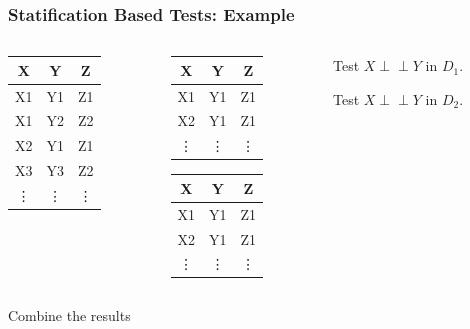 \documentclass{beamer}
\def\ci{\perp\!\!\!\!\!\perp}
\begin{document}
\begin{frame}
	\frametitle{Statification Based Tests: Example}
	\begin{block}{}
	\begin{columns}
		\begin{column}{0.33 \textwidth}
			\begin{tabular}{c c c}
				X  & Y  & Z \\
				\hline
				X1 & Y1 & Z1 \\
				X1 & Y2 & Z2 \\
				X2 & Y1 & Z1 \\
				X3 & Y3 & Z2 \\
				\vdots & \vdots & \vdots \\
			\end{tabular}
		\end{column}
		\begin{column}{0.33 \textwidth}
			\begin{block}{}
				\begin{tabular}{c c c}
					X & Y & Z \\
					\hline
					X1 & Y1 & Z1 \\
					X2 & Y1 & Z1 \\
					\vdots & \vdots & \vdots \\
				\end{tabular}
			\end{block}
			\begin{block}{}
				\begin{tabular}{c c c}
					X & Y & Z \\
					\hline
					X1 & Y1 & Z1 \\
					X2 & Y1 & Z1 \\
					\vdots & \vdots & \vdots \\
				\end{tabular}
			\end{block}
		\end{column}
		\begin{column}{0.33 \textwidth}
			\begin{block}{}
				Test $X \ci Y$ in $ D_1 $.
			\end{block}
			\begin{block}{}
				Test $X \ci Y$ in $ D_2 $.
			\end{block}
		\end{column}
	\end{columns}
	\end{block}
	\begin{block}{}
		Combine the results
	\end{block}
\end{frame}
\end{document}
